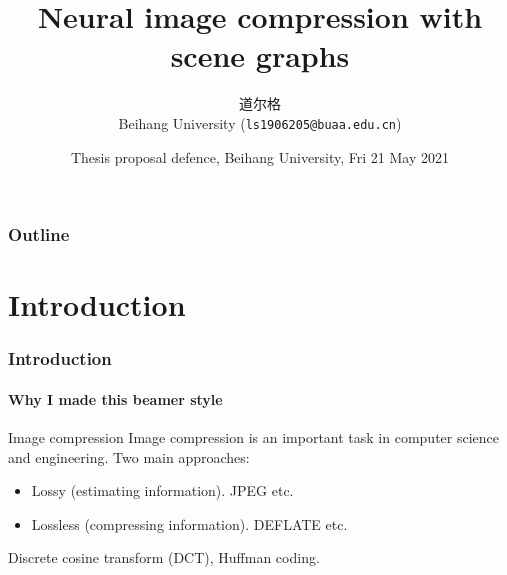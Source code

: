 \documentclass[10pt]{beamer}
\title{Neural image compression with scene graphs}
\author{道尔格\\
Beihang University (\texttt{ls1906205@buaa.edu.cn})}
\date{Thesis proposal defence, Beihang University, Fri  21 May 2021}
\begin{document}
\begin{frame}[plain]
    \maketitle
\end{frame}

\begin{frame}
    \frametitle{Outline}
    \tableofcontents
\end{frame}
\section{Introduction}
\begin{frame}
    \frametitle{Introduction}

    \framesubtitle{Why I made this beamer style}
    \begin{block}{Image compression}
        Image compression is an important task in computer science and engineering.
        Two main approaches:
        \begin{itemize}
            \item Lossy (estimating information). JPEG etc.
            \item Lossless (compressing information). DEFLATE etc.
        \end{itemize}
        Discrete cosine transform (DCT), Huffman coding.
    \end{block}
\end{frame}
\end{document}
